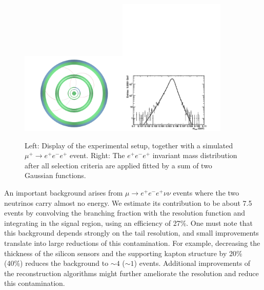 \begin{figure}[htb]
\begin{center}
\includegraphics[width=0.45\textwidth]{ChargedLeptons/Figures/event.pdf}\includegraphics[width=0.45\textwidth]{ChargedLeptons/Figures/resoFit.pdf}
\end{center}
\caption{Left: Display of the experimental setup, together with a simulated $\mu^+ \rightarrow e^+e^-e^+$ event. 
Right:  The $e^+e^-e^+$ invariant mass distribution after all selection criteria are applied fitted by a 
sum of two Gaussian functions.}
\label{Fig::mu3e}
\end{figure}

An important background arises from $\mu \rightarrow e^+e^-e^+ \nu\nu$ events where the two neutrinos carry almost no energy. We estimate its contribution to be about 7.5 events by convolving the branching fraction with the resolution function and integrating in the signal region, using an efficiency of 27\%. One must note that this background depends strongly on the tail resolution, and small improvements translate into large reductions of this contamination. For example, decreasing the thickness of the silicon sensors and the supporting kapton structure by 20\% (40\%) reduces the background to $\sim 4$ ($\sim 1$) events. Additional improvements of the reconstruction algorithms might further ameliorate the resolution and reduce this contamination.

